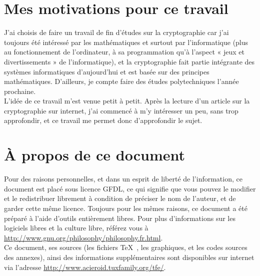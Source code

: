 
\section{Mes motivations pour ce travail}
J'ai choisis de faire un travail de fin d'études sur la cryptographie
car j'ai toujours été intéressé par les mathématiques et surtout par
l'informatique (plus au fonctionnement de l'ordinateur, à sa
programmation qu'à l'aspect « jeux et divertissements » de
l'informatique), et la cryptographie fait partie intégrante des
systèmes informatiques d'aujourd'hui et est basée sur des principes
mathématiques. D'ailleurs, je compte faire des études polytechniques
l'année prochaine. \\ L'idée de ce travail m'est venue petit à
petit. Après la lecture d'un article sur la cryptographie sur
internet, j'ai commencé à m'y intéresser un peu, sans trop
approfondir, et ce travail me permet donc d'approfondir le sujet.

\section{À propos de ce document}
Pour des raisons personnelles, et dans un esprit de liberté de
l'information, ce document est placé sous licence GFDL, ce qui
signifie que vous pouvez le modifier et le redistribuer librement à
condition de préciser le nom de l'auteur, et de garder cette même
licence. Toujours pour les mêmes raisons, ce document a été préparé à
l'aide d'outils entièrement libres.
Pour plus d'informations sur les logiciels libres et la culture
libre, référez vous à \url{http://www.gnu.org/philosophy/philosophy.fr.html}. \\
Ce document, ses sources (les fichiers \TeX~, les graphiques, et les
codes sources des annexes), ainsi des informations supplémentaires
sont disponibles sur internet via l'adresse
\url{http://www.acieroid.tuxfamily.org/tfe/}. \\


